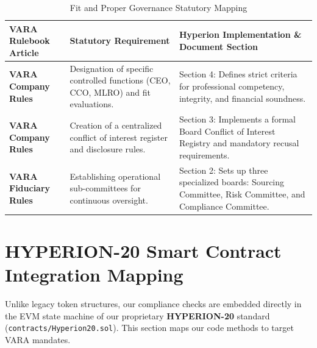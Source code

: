 \documentclass[11pt,a4paper]{article}
\begin{document}
\begin{table}[h!]
\centering
\begin{tabularx}{\textwidth}{l p{5cm} X}
\toprule
\textbf{VARA Rulebook Article} & \textbf{Statutory Requirement} & \textbf{Hyperion Implementation \& Document Section} \\
\midrule
\textbf{VARA Company Rules} & Designation of specific controlled functions (CEO, CCO, MLRO) and fit evaluations. & Section 4: Defines strict criteria for professional competency, integrity, and financial soundness. \\
\midrule
\textbf{VARA Company Rules} & Creation of a centralized conflict of interest register and disclosure rules. & Section 3: Implements a formal Board Conflict of Interest Registry and mandatory recusal requirements. \\
\midrule
\textbf{VARA Fiduciary Rules} & Establishing operational sub-committees for continuous oversight. & Section 2: Sets up three specialized boards: Sourcing Committee, Risk Committee, and Compliance Committee. \\
\bottomrule
\end{tabularx}
\caption{Fit and Proper Governance Statutory Mapping}
\end{table}

\clearpage

\section{HYPERION-20 Smart Contract Integration Mapping}
Unlike legacy token structures, our compliance checks are embedded directly in the EVM state machine of our proprietary \textbf{HYPERION-20} standard (\texttt{contracts/Hyperion20.sol}). This section maps our code methods to target VARA mandates.
\par\vspace{10pt}
\end{document}
